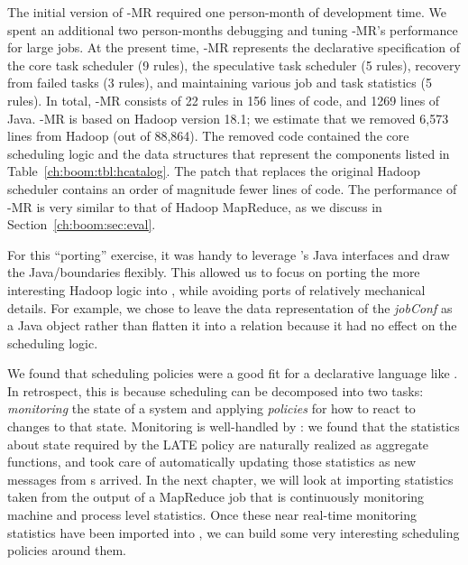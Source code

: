 The initial version of \BOOM-MR required one person-month of development time.
We spent an additional two person-months debugging and tuning \BOOM-MR's
performance for large jobs.  At the present time, \BOOM-MR represents the
declarative specification of the core task scheduler (9 rules), the speculative
task scheduler (5 rules), recovery from failed tasks (3 rules), and maintaining
various job and task statistics (5 rules).  In total, \BOOM-MR consists of 22
\OVERLOG rules in 156 lines of code, and 1269 lines of Java.  \BOOM-MR is based
on Hadoop version 18.1; we estimate that we removed 6,573 lines from Hadoop
(out of 88,864).  The removed code contained the core scheduling logic and the
data structures that represent the components listed in
Table~\ref{ch:boom:tbl:hcatalog}.  The \OVERLOG patch that replaces the
original Hadoop scheduler contains an order of magnitude fewer lines of code.
The performance of \BOOM-MR is very similar to that of Hadoop MapReduce, as we
discuss in Section~\ref{ch:boom:sec:eval}.

For this ``porting'' exercise, it was handy to leverage \JOL's Java interfaces
and draw the Java/\OVERLOG boundaries flexibly.  This allowed us to focus on
porting the more interesting Hadoop logic into \OVERLOG, while avoiding ports of
relatively mechanical details.  For example, we chose to leave the data
representation of the \emph{jobConf} as a Java object rather than flatten it
into a relation because it had no effect on the scheduling logic.

We found that scheduling policies were a good fit for a declarative language
like \OVERLOG. In retrospect, this is because scheduling can be decomposed into
two tasks: \emph{monitoring} the state of a system and applying \emph{policies}
for how to react to changes to that state. Monitoring is well-handled by \OVERLOG: 
we found that the statistics about {\TT} state required by the LATE policy are naturally 
realized as aggregate functions, and \JOL took care of automatically updating those statistics 
as new messages from {\TT}s arrived. In the next chapter, we will look at importing statistics
taken from the output of a MapReduce job that is continuously monitoring machine and process level statistics.
Once these near real-time monitoring statistics have been imported into \JOL, we can build some 
very interesting scheduling policies around them.

